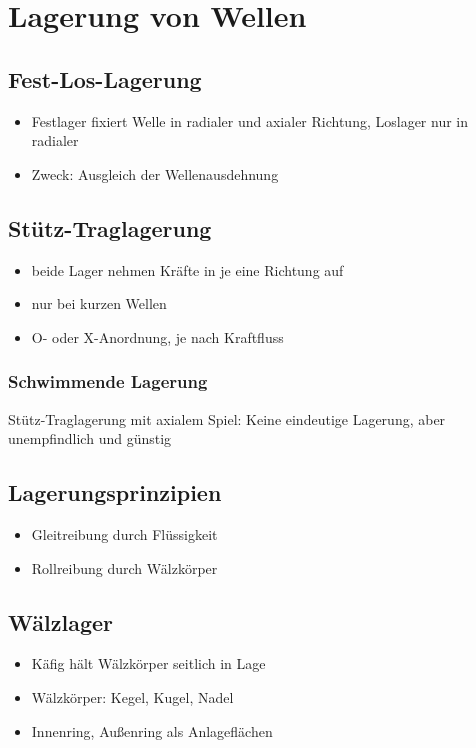 \documentclass[a4paper,DIV=15,fontsize=11pt]{scrartcl}
\begin{document}
\section{Lagerung von Wellen}
\subsection{Fest-Los-Lagerung}
\begin{itemize}
	\item Festlager fixiert Welle in radialer und axialer Richtung, Loslager nur in radialer
	\item Zweck: Ausgleich der Wellenausdehnung
\end{itemize}

	
\subsection{Stütz-Traglagerung}
\begin{itemize}
	\item beide Lager nehmen Kräfte in je eine Richtung auf
	\item nur bei kurzen Wellen
	\item O- oder X-Anordnung, je nach Kraftfluss
\end{itemize}
	
\subsubsection{Schwimmende Lagerung}
Stütz-Traglagerung mit axialem Spiel:
Keine eindeutige Lagerung, aber unempfindlich und günstig
	
\subsection{Lagerungsprinzipien}
\begin{itemize}
	\item Gleitreibung durch Flüssigkeit
	\item Rollreibung durch Wälzkörper
\end{itemize}
	
\subsection{Wälzlager}
\begin{itemize}
	\item Käfig hält Wälzkörper seitlich in Lage
	\item Wälzkörper: Kegel, Kugel, Nadel
	\item Innenring, Außenring als Anlageflächen
\end{itemize}
	
\end{document}
